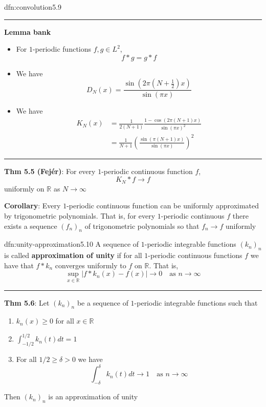\documentclass[landscape, 8pt]{extarticle}
\begin{document}
\begin{multicols}{3}
\begin{dfn}[Convolution]{dfn:convolution}{5.9}
	\noindent\rule{\textwidth}{0.2pt}
	\textbf{Lemma bank}
	\begin{itemize}
	    \setlength\itemsep{0em}
	    \item[\textbf{5.2}] For $1$-periodic functions $f, g\in L^{2}$,
			\[f * g = g * f\]
		\item[\textbf{5.3}] We have
			\[D_{N}(x) = \frac{\sin(2 \pi(N + \frac{1}{2})x)}{\sin( \pi x)}\]
		\item[\textbf{5.4}] We have
			\begin{align*}
				K_{N}(x) &= \frac{1}{2(N+1)} \frac{1 - \cos(2\pi(N + 1)x)}{\sin(\pi x)^{2}}\\
						 &= \frac{1}{N+1} \left( \frac{\sin(\pi(N + 1) x)}{\sin(\pi x)}\right)^{2}
			\end{align*}
	\end{itemize}
	\noindent\rule{\textwidth}{0.2pt}
	\textbf{Thm 5.5 (Fejér)}: For every $1$-periodic continuous function $f$,
	\[K_{N} * f \to f\]
	uniformly on $\mathbb{R}$ as $N\to\infty$

	\textbf{Corollary}: Every $1$-periodic continuous function can be uniformly approximated by trigonometric polynomials. That is, for every $1$-periodic continuous $f$ there exists a sequence $(f_{n})_{n}$ of trigonometric polynomials so that $f_{n} \to f$ uniformly
\end{dfn}

\newpage
\begin{dfn}{dfn:unity-approximation}{5.10}
	A sequence of $1$-periodic integrable functions $(k_{n})_{n}$ is called \textbf{approximation of unity} if for all $1$-periodic continuous functions $f$ we have that $f * k_{n}$ converges uniformly to $f$ on $\mathbb{R}$. That is,
	\[\sup_{x\in\mathbb{R}} \lvert f * k_{n}(x) - f(x) \rvert \to 0 \quad \text{as $n\to\infty$}\]

	\noindent\rule{\textwidth}{0.2pt}
	\textbf{Thm 5.6}: Let $(k_{n})_{n}$ be a sequence of $1$-periodic integrable functions such that
	\begin{enumerate}
	    \item $k_{n}(x) \ge 0$ for all $x\in\mathbb{R}$
	    \item $\int_{-1 /2}^{1 /2} k_{n}(t) dt = 1$
	    \item For all $1 /2 \ge \delta > 0$ we have
			\[\int_{-\delta}^{\delta} k_{n}(t) dt \to 1 \quad\text{as $n\to\infty$}\]
	\end{enumerate}

	Then $(k_{n})_{n}$ is an approximation of unity


\end{dfn}
\end{multicols}
\end{document}
